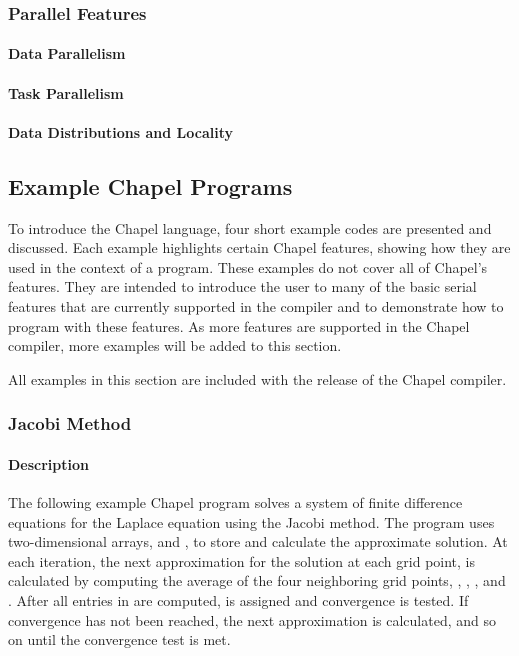 \subsubsection{Parallel Features}
\paragraph{Data Parallelism}
\paragraph{Task Parallelism}
\paragraph{Data Distributions and Locality}

\subsection{Example Chapel Programs}

To introduce the Chapel language, four short example codes are presented and
discussed.  Each example highlights certain Chapel features, showing how they are used
in the context of a program.  These examples do not cover all of Chapel's features.
They are intended to introduce the user to many of the basic serial features that are
currently supported in the compiler and to demonstrate how to program with 
these features.  As more features are supported in the Chapel compiler, more 
examples will be added to this section.

All examples in this section are included with the release of the Chapel compiler.

\subsubsection{Jacobi Method}

\paragraph{Description}
The following example Chapel program solves a system of finite difference
equations for the Laplace equation using the Jacobi method.  The program uses
two-dimensional arrays,  and , to store and calculate the approximate
solution.  At each iteration, the next approximation for the solution at 
each grid point,  is calculated by computing the average of 
the four neighboring grid points,
, , , and .  
After all entries in  are computed,  is assigned 
and convergence is tested.  If convergence has not been reached, the next
approximation is calculated, and so on until the convergence test is met.

